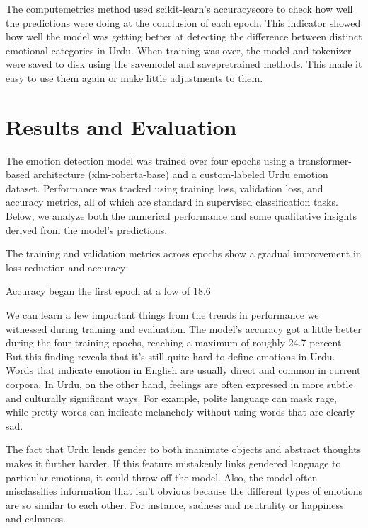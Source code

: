 \documentclass[12pt]{article}
\begin{document}
The computemetrics method used scikit-learn's accuracyscore to check how well the predictions were doing at the conclusion of each epoch. This indicator showed how well the model was getting better at detecting the difference between distinct emotional categories in Urdu. When training was over, the model and tokenizer were saved to disk using the savemodel and savepretrained methods. This made it easy to use them again or make little adjustments to them.

\section{Results and Evaluation}

The emotion detection model was trained over four epochs using a transformer-based architecture (xlm-roberta-base) and a custom-labeled Urdu emotion dataset. Performance was tracked using training loss, validation loss, and accuracy metrics, all of which are standard in supervised classification tasks. Below, we analyze both the numerical performance and some qualitative insights derived from the model’s predictions.

The training and validation metrics across epochs show a gradual improvement in loss reduction and accuracy:

Accuracy began the first epoch at a low of 18.6%

We can learn a few important things from the trends in performance we witnessed during training and evaluation.   The model's accuracy got a little better during the four training epochs, reaching a maximum of roughly 24.7 percent.  But this finding reveals that it's still quite hard to define emotions in Urdu.   Words that indicate emotion in English are usually direct and common in current corpora.  In Urdu, on the other hand, feelings are often expressed in more subtle and culturally significant ways.   For example, polite language can mask rage, while pretty words can indicate melancholy without using words that are clearly sad.

The fact that Urdu lends gender to both inanimate objects and abstract thoughts makes it further harder.   If this feature mistakenly links gendered language to particular emotions, it could throw off the model.   Also, the model often misclassifies information that isn't obvious because the different types of emotions are so similar to each other.  For instance, sadness and neutrality or happiness and calmness.
\end{document}
